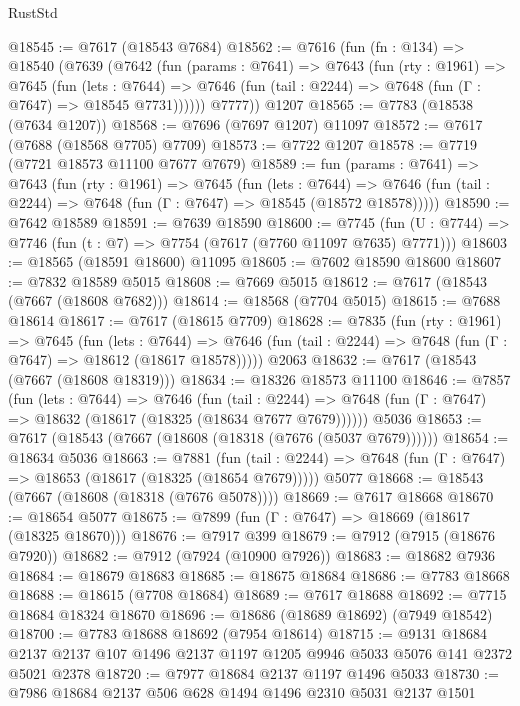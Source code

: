 \begin{lexlean}{RustStd}
\begin{coremodule}
@18545 := @7617 (@18543 @7684)
@18562 := @7616
    (fun (fn : @134) =>
    @18540
      (@7639
        (@7642
          (fun (params : @7641) =>
          @7643
            (fun (rty : @1961) =>
            @7645
              (fun (lets : @7644) =>
              @7646 (fun (tail : @2244) => @7648 (fun (Γ : @7647) => @18545 @7731))))))
        @7777))
    @1207
@18565 := @7783 (@18538 (@7634 @1207))
@18568 := @7696 (@7697 @1207) @11097
@18572 := @7617 (@7688 (@18568 @7705) @7709)
@18573 := @7722 @1207
@18578 := @7719 (@7721 @18573 @11100 @7677 @7679)
@18589 := fun (params : @7641) =>
  @7643
    (fun (rty : @1961) =>
    @7645
      (fun (lets : @7644) =>
      @7646 (fun (tail : @2244) => @7648 (fun (Γ : @7647) => @18545 (@18572 @18578)))))
@18590 := @7642 @18589
@18591 := @7639 @18590
@18600 := @7745
    (fun (U : @7744) => @7746 (fun (t : @7) => @7754 (@7617 (@7760 @11097 @7635) @7771)))
@18603 := @18565 (@18591 @18600) @11095
@18605 := @7602 @18590 @18600
@18607 := @7832 @18589 @5015
@18608 := @7669 @5015
@18612 := @7617 (@18543 (@7667 (@18608 @7682)))
@18614 := @18568 (@7704 @5015)
@18615 := @7688 @18614
@18617 := @7617 (@18615 @7709)
@18628 := @7835
    (fun (rty : @1961) =>
    @7645
      (fun (lets : @7644) =>
      @7646 (fun (tail : @2244) => @7648 (fun (Γ : @7647) => @18612 (@18617 @18578)))))
    @2063
@18632 := @7617 (@18543 (@7667 (@18608 @18319)))
@18634 := @18326 @18573 @11100
@18646 := @7857
    (fun (lets : @7644) =>
    @7646
      (fun (tail : @2244) =>
      @7648 (fun (Γ : @7647) => @18632 (@18617 (@18325 (@18634 @7677 @7679))))))
    @5036
@18653 := @7617 (@18543 (@7667 (@18608 (@18318 (@7676 (@5037 @7679))))))
@18654 := @18634 @5036
@18663 := @7881
    (fun (tail : @2244) => @7648 (fun (Γ : @7647) => @18653 (@18617 (@18325 (@18654 @7679)))))
    @5077
@18668 := @18543 (@7667 (@18608 (@18318 (@7676 @5078))))
@18669 := @7617 @18668
@18670 := @18654 @5077
@18675 := @7899 (fun (Γ : @7647) => @18669 (@18617 (@18325 @18670)))
@18676 := @7917 @399
@18679 := @7912 (@7915 (@18676 @7920))
@18682 := @7912 (@7924 (@10900 @7926))
@18683 := @18682 @7936
@18684 := @18679 @18683
@18685 := @18675 @18684
@18686 := @7783 @18668
@18688 := @18615 (@7708 @18684)
@18689 := @7617 @18688
@18692 := @7715 @18684 @18324 @18670
@18696 := @18686 (@18689 @18692) (@7949 @18542)
@18700 := @7783 @18688 @18692 (@7954 @18614)
@18715 := @9131
    @18684
    @2137
    @2137
    @107
    @1496
    @2137
    @1197
    @1205
    @9946
    @5033
    @5076
    @141
    @2372
    @5021
    @2378
@18720 := @7977 @18684 @2137 @1197 @1496 @5033
@18730 := @7986 @18684 @2137 @506 @628 @1494 @1496 @2310 @5031 @2137 @1501

\end{coremodule}
\end{lexlean}
